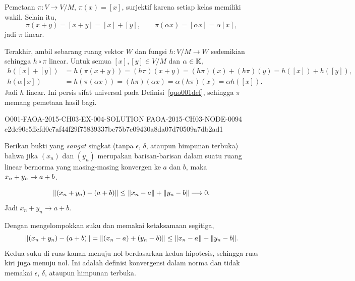 \begin{o001solution}
\begin{o001proof}
Pemetaan $\pi\colon V\to V/M$, $\pi(x)=[x]$, surjektif karena setiap kelas
memiliki wakil. Selain itu,
\[
\pi(x+y)=[x+y]=[x]+[y],\qquad
\pi(\alpha x)=[\alpha x]=\alpha[x],
\]
jadi $\pi$ linear.

Terakhir, ambil sebarang ruang vektor $W$ dan fungsi
$h\colon V/M\to W$ sedemikian sehingga $h\circ\pi$ linear. Untuk semua
$[x],[y]\in V/M$ dan $\alpha\in\mathbb{K}$,
\[
\begin{aligned}
h([x]+[y])
 &=h(\pi(x+y))
  =(h\pi)(x+y)
  =(h\pi)(x)+(h\pi)(y)
  =h([x])+h([y]),\\
h(\alpha[x])
 &=h(\pi(\alpha x))
  =(h\pi)(\alpha x)
  =\alpha(h\pi)(x)
  =\alpha h([x]).
\end{aligned}
\]
Jadi $h$ linear. Ini persis sifat universal pada
Definisi~\ref{quo001def}, sehingga $\pi$ memang pemetaan hasil bagi.
\end{o001proof}
\end{o001solution}

\begin{o001solution}
  {O001-FAOA-2015-CH03-EX-004-SOLUTION}
  {FAOA-2015-CH03-NODE-0094}
  {c2de90c5ffcfd0c7af44f29f75839337bc75b7c09430a8da07d70509a7db2ad1}
\begin{o001statement}
Berikan bukti yang \emph{sangat} singkat (tanpa $\epsilon$, $\delta$, ataupun himpunan terbuka) bahwa jika
$(x_n)$ dan $(y_n)$ merupakan barisan-barisan dalam suatu ruang linear bernorma yang masing-masing konvergen ke $a$ dan $b$,
maka $x_n + y_n \rightarrow a + b$.
\end{o001statement}
\begin{o001answer}
\[
\lVert(x_n+y_n)-(a+b)\rVert
\le\lVert x_n-a\rVert+\lVert y_n-b\rVert\longrightarrow0.
\]
Jadi $x_n+y_n\to a+b$.
\end{o001answer}
\begin{o001proof}
Dengan mengelompokkan suku dan memakai ketaksamaan segitiga,
\[
\lVert(x_n+y_n)-(a+b)\rVert
=\lVert(x_n-a)+(y_n-b)\rVert
\le\lVert x_n-a\rVert+\lVert y_n-b\rVert.
\]
Kedua suku di ruas kanan menuju nol berdasarkan kedua hipotesis, sehingga
ruas kiri juga menuju nol. Ini adalah definisi konvergensi dalam norma dan
tidak memakai $\epsilon$, $\delta$, ataupun himpunan terbuka.
\end{o001proof}
\end{o001solution}


